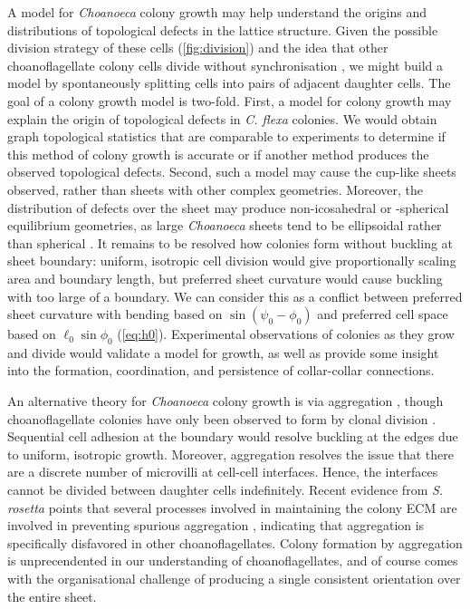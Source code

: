 A model for \textit{Choanoeca} colony growth may help understand the origins and distributions of topological defects in the lattice structure. 
Given the possible division strategy of these cells (\cref{fig:division}) and the idea that other choanoflagellate colony cells divide without synchronisation \citep{larson2020}, we might build a model by spontaneously splitting cells into pairs of adjacent daughter cells.
The goal of a colony growth model is two-fold.
First, a model for colony growth may explain the origin of topological defects in \textit{C. flexa} colonies.
We would obtain graph topological statistics that are comparable to experiments to determine if this method of colony growth is accurate or if another method produces the observed topological defects.
Second, such a model may cause the cup-like sheets observed, rather than sheets with other complex geometries.
Moreover, the distribution of defects over the sheet may produce non-icosahedral or -spherical equilibrium geometries, as large \textit{Choanoeca} sheets tend to be ellipsoidal rather than spherical \citep{leadbeater1983,brunet2019}.
It remains to be resolved how colonies form without buckling at sheet boundary: uniform, isotropic cell division would give proportionally scaling area and boundary length, but preferred sheet curvature would cause buckling with too large of a boundary.
We can consider this as a conflict between preferred sheet curvature with bending based on $\sin (\psi_0 - \phi_0)$ and preferred cell space based on $\ell_0 \sin \phi_0$ (\cref{eq:h0}).
Experimental observations of colonies as they grow and divide would validate a model for growth, as well as provide some insight into the formation, coordination, and persistence of collar-collar connections.

An alternative theory for \textit{Choanoeca} colony growth is via aggregation \citep{grosberg2007}, though choanoflagellate colonies have only been observed to form by clonal division \citep{fairclough2010,alegado2012,woznica2016}.
Sequential cell adhesion at the boundary would resolve buckling at the edges due to uniform, isotropic growth.
Moreover, aggregation resolves the issue that there are a discrete number of microvilli at cell-cell interfaces.
Hence, the interfaces cannot be divided between daughter cells indefinitely.
Recent evidence from \textit{S. rosetta} points that several processes involved in maintaining the colony ECM are involved in preventing spurious aggregation \citep{wetzel2018}, indicating that aggregation is specifically disfavored in other choanoflagellates.
Colony formation by aggregation is unprecendented in our understanding of choanoflagellates, and of course comes with the organisational challenge of producing a single consistent orientation over the entire sheet.

